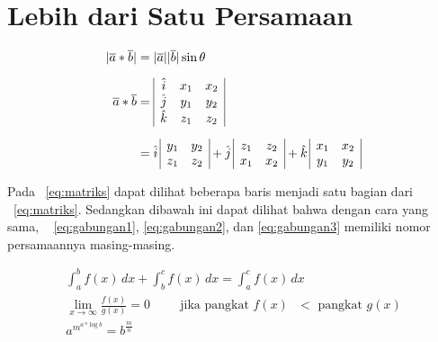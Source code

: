 \section{Lebih dari Satu Persamaan}
\label{sec:multiEqu}
\noindent \begin{align}\label{eq:matriks}	
	|\overline{a} * \overline{b}| &= |\overline{a}| |\overline{b}| \sin\theta 
		\\[0.2cm]
	\overline{a} * \overline{b} &=  
		\begin{array}{| c c c |}
			\hat{i} & x_{1} & x_{2} \\
			\hat{j} & y_{1} & y_{2} \\
			\hat{k} & z_{1} & z_{2} \\
		\end{array} \nonumber \\[0.2cm]
	&= \hat{i} \,
		\begin{array}{ | c c | }
			y_{1} & y_{2} \\
			z_{1} & z_{2} \\
		\end{array} 
	   + \hat{j} \,
		\begin{array}{ | c c | }
			z_{1} & z_{2} \\
			x_{1} & x_{2} \\
		\end{array} 
	   + \hat{k} \,	
		\begin{array}{ | c c | }
			x_{1} & x_{2} \\
			y_{1} & y_{2} \\
		\end{array}
		\nonumber
\end{align}

Pada \equ~\ref{eq:matriks} dapat dilihat beberapa baris menjadi satu bagian 
dari \equ~\ref{eq:matriks}. 
Sedangkan dibawah ini dapat dilihat bahwa dengan cara yang sama, \equ~
\ref{eq:gabungan1}, \ref{eq:gabungan2}, dan \ref{eq:gabungan3} memiliki nomor 
persamaannya masing-masing. 

\noindent \begin{align}\label{eq:gabungan1}	
	\int_{a}^{b} f(x)\, dx + \int_{b}^{c} f(x) \, dx = \int_{a}^{c} f(x) \, dx
		\\\label{eq:gabungan2}
	\lim_{x \to \infty} \frac{f(x)}{g(x)} = 0 \hspace{1cm} 
		\text{jika pangkat $f(x)$ $<$ pangkat $g(x)$} \\\label{eq:gabungan3}
	a^{m^{a \, ^{n}\log b }} = b^{\frac{m}{n}}
\end{align}
\fi
